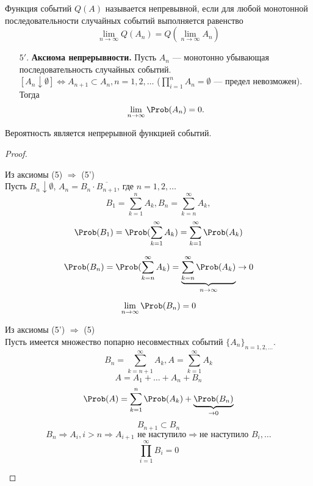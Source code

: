 \begin{definition}
	Функция событий $Q(A)$ называется непревывной, если для любой монотонной последовательности случайных событий выполняется равенство
	\[
		\lim\limits_{n \to \infty} Q(A_n) = Q(\lim\limits_{n \to \infty} A_n)
	\]
\end{definition}
\begin{enumerate}
	\setcounter{enumi}{4}
	\item[$5'.$] \textbf{Аксиома непрерывности.} Пусть $A_n$ --- монотонно убывающая последовательность случайных событий. \\ $[A_n \downarrow \emptyset] \Leftrightarrow A_{n+1} \subset A_n, n = 1, 2, \dots$ ($\prod\limits_{i=1}^n A_n = \emptyset$ --- предел невозможен). Тогда
	      \[
		      \lim\limits_{n \to \infty} \Prob(A_n) = 0.
	      \]
\end{enumerate}

\begin{theorem}
	Вероятность является непрерывной функцией событий.
\end{theorem}
\begin{proof}
	\begin{description}[leftmargin = 0cm]
		\item Из аксиомы (5) $\Rightarrow$ (5') \\
		      Пусть $B_n \downarrow \emptyset$, $A_n = B_n \cdot \overline{B_{n+1}}$, где $n = 1,2, \dots$ \\
		      \[
			      B_1 = \sum\limits_{k=1}^n A_k, B_n = \sum\limits_{k=n}^\infty A_k,
		      \]
		      \[
			      \Prob(B_1) = \Prob(\sum\limits_{k=1}^\infty A_k) = \sum\limits_{k=1}^\infty \Prob(A_k)
		      \]

		      \[ \Prob(B_n) = \Prob(\sum\limits_{k=n}^\infty A_k) = \underbrace{\sum\limits_{k=n}^\infty \Prob(A_k)}_{n \to \infty} \to 0 \]

		      \[ \lim\limits_{n \to \infty} \Prob (B_n) = 0\]
		\item Из аксиомы (5') $\Rightarrow$ (5) \\
		      Пусть имеется множество попарно несовместных событий ${\{A_n\}}_{n = 1, 2, \dots}$.
		      \[ B_n = \sum\limits_{k=n+1}^\infty A_k, A = \sum\limits_{k=1}^\infty A_k \]
		      \[ A = A_1 + \ldots + A_n + B_n \]
		      \[ \Prob(A) = \sum\limits_{k=1}^n \Prob(A_k) + \underbrace{\Prob(B_n)}_{\to 0} \]
		      \[ B_{n+1} \subset B_n \]
		      \[ B_n \Rightarrow A_i, i > n \Rightarrow A_{i+1} \text{ не наступило} \Rightarrow \text{не наступило } B_i, \dots \]
		      \[ \prod\limits_{i=1}^\infty B_i = 0 \]
	\end{description}
\end{proof}
